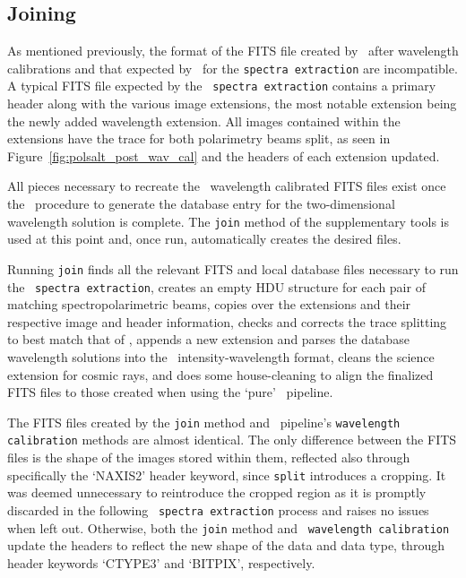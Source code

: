 \subsection{Joining}

As mentioned previously, the format of the \gls{FITS} file created by \iraf\ after wavelength calibrations and that expected by \polsalt\ for the \texttt{spectra extraction} are incompatible. A typical \gls{FITS} file expected by the \polsalt\ \texttt{spectra extraction} contains a primary header along with the various image extensions, the most notable extension being the newly added wavelength extension. All images contained within the extensions have the trace for both polarimetry beams split, as seen in Figure~\ref{fig:polsalt_post_wav_cal} and the headers of each extension updated.

All pieces necessary to recreate the \polsalt\ wavelength calibrated \gls{FITS} files exist once the \iraf\ procedure to generate the database entry for the two-dimensional wavelength solution is complete. The \texttt{join} method of the supplementary tools is used at this point and, once run, automatically creates the desired files.

Running \texttt{join} finds all the relevant \gls{FITS} and local database files necessary to run the \polsalt\ \texttt{spectra extraction}, creates an empty \gls{HDU} structure for each pair of matching spectropolarimetric beams, copies over the extensions and their respective image and header information, checks and corrects the trace splitting to best match that of \polsalt, appends a new extension and parses the database wavelength solutions into the \polsalt\ intensity-wavelength format, cleans the science extension for cosmic rays, and does some house-cleaning to align the finalized \gls{FITS} files to those created when using the `pure' \polsalt\ pipeline.

The \gls{FITS} files created by the \texttt{join} method and \polsalt\ pipeline's \texttt{wavelength calibration} methods are almost identical. The only difference between the \gls{FITS} files is the shape of the images stored within them, reflected also through specifically the `NAXIS2' header keyword, since \texttt{split} introduces a cropping. It was deemed unnecessary to reintroduce the cropped region as it is promptly discarded in the following \polsalt\ \texttt{spectra extraction} process and raises no issues when left out. Otherwise, both the \texttt{join} method and \polsalt\ \texttt{wavelength calibration} update the headers to reflect the new shape of the data and data type, through header keywords `CTYPE3' and `BITPIX', respectively.

